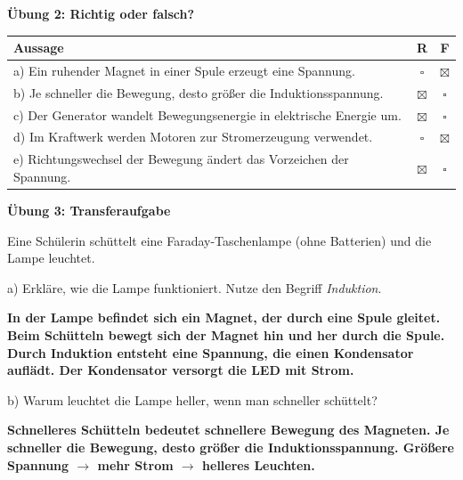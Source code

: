 \documentclass[11pt,a4paper]{article}
\newcommand{\aufgabe}[1]{\noindent\textbf{\textcolor{fachfarbe}{#1}}}
\newcommand{\lsg}[1]{\textcolor{loesung}{\textbf{#1}}}
\begin{document}
\vspace{0.4em}

\aufgabe{Übung 2: Richtig oder falsch?}

\vspace{0.2em}
{\small
\begin{tabular}{|p{12cm}|c|c|}
\hline
\textbf{Aussage} & \textbf{R} & \textbf{F} \\
\hline
a) Ein ruhender Magnet in einer Spule erzeugt eine Spannung. & $\square$ & \lsg{$\boxtimes$} \\
\hline
b) Je schneller die Bewegung, desto größer die Induktionsspannung. & \lsg{$\boxtimes$} & $\square$ \\
\hline
c) Der Generator wandelt Bewegungsenergie in elektrische Energie um. & \lsg{$\boxtimes$} & $\square$ \\
\hline
d) Im Kraftwerk werden Motoren zur Stromerzeugung verwendet. & $\square$ & \lsg{$\boxtimes$} \\
\hline
e) Richtungswechsel der Bewegung ändert das Vorzeichen der Spannung. & \lsg{$\boxtimes$} & $\square$ \\
\hline
\end{tabular}
}

\vspace{0.4em}

\aufgabe{Übung 3: Transferaufgabe}

\vspace{0.2em}
{\small Eine Schülerin schüttelt eine Faraday-Taschenlampe (ohne Batterien) und die Lampe leuchtet.}

\vspace{0.2em}
a) Erkläre, wie die Lampe funktioniert. Nutze den Begriff \textit{Induktion}.

\vspace{0.1em}
\lsg{In der Lampe befindet sich ein Magnet, der durch eine Spule gleitet. Beim Schütteln bewegt sich der Magnet hin und her durch die Spule. Durch Induktion entsteht eine Spannung, die einen Kondensator auflädt. Der Kondensator versorgt die LED mit Strom.}

\vspace{0.3em}
b) Warum leuchtet die Lampe heller, wenn man schneller schüttelt?

\vspace{0.1em}
\lsg{Schnelleres Schütteln bedeutet schnellere Bewegung des Magneten. Je schneller die Bewegung, desto größer die Induktionsspannung. Größere Spannung $\rightarrow$ mehr Strom $\rightarrow$ helleres Leuchten.}
\end{document}
